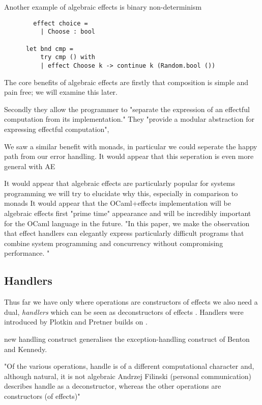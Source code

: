 Another example of algebraic effects is binary non-determinism
\begin{example}
    \begin{verbatim}
        effect choice =
          | Choose : bool

      let bnd cmp =
          try cmp () with
          | effect Choose k -> continue k (Random.bool ())
    \end{verbatim}
\end{example}

The core benefits of algebraic effects are
firstly that composition is simple and pain free;
we will examine this later.

Secondly they allow the programmer to
"separate the expression of an effectful computation from its implementation."
They "provide a modular abstraction for expressing effectful computation"\cite{dolan2015effective},
\cite{dolan2015effective}

We saw a similar benefit with monads,
in particular we could seperate the happy path from our error handling.
It would appear that this seperation is even more general with AE

It would appear that algebraic effects are particularly popular
for systems programming
\cite{dolan2015effective}
\cite{dolan2017concurrent}
\cite{dolaneffectively}
\cite{Dolan:2017}
we will try to elucidate why this,
especially in comparison to monads
It would appear that the OCaml+effects implementation
will be algebraic effects first "prime time" appearance
and will be incredibly important for the OCaml language in the future.
"In this paper, we make the observation that effect handlers
can elegantly express particularly difficult programs
that combine system programming and concurrency without compromising performance. "
\cite{Dolan:2017}

\subsection{Handlers}
Thus far we have only
where operations are constructors of effects
we also need a dual,
\textit{handlers} which can be seen as deconstructors of effects
\cite{}.
Handlers were introduced by Plotkin and Pretner\cite{Plotkin:2009dr}
builds on
\cite{benton2001exceptional}.

new handling construct generalises the exception-handling construct of Benton and Kennedy. \cite{benton2001exceptional}

"Of the various operations, handle is of a different computational character and,
although natural, it is not algebraic
Andrzej Filinski (personal communication) describes handle as a deconstructor,
whereas the other operations are constructors (of effects)"
\cite{Plotkin:2002dw}

